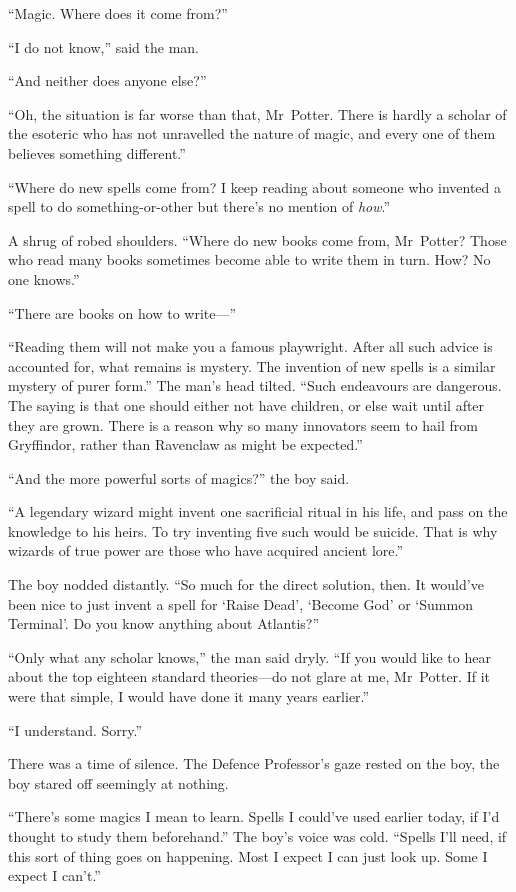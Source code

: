 “Magic. Where does it come from?”

“I do not know,” said the man.

“And neither does anyone else?”

“Oh, the situation is far worse than that, Mr~Potter. There is hardly a scholar of the esoteric who has not unravelled the nature of magic, and every one of them believes something different.”

“Where do new spells come from? I keep reading about someone who invented a spell to do something-or-other but there’s no mention of \emph{how}.”

A shrug of robed shoulders. “Where do new books come from, Mr~Potter? Those who read many books sometimes become able to write them in turn. How? No one knows.”

“There are books on how to write—”

“Reading them will not make you a famous playwright. After all such advice is accounted for, what remains is mystery. The invention of new spells is a similar mystery of purer form.” The man’s head tilted. “Such endeavours are dangerous. The saying is that one should either not have children, or else wait until after they are grown. There is a reason why so many innovators seem to hail from Gryffindor, rather than Ravenclaw as might be expected.”

“And the more powerful sorts of magics?” the boy said.

“A legendary wizard might invent one sacrificial ritual in his life, and pass on the knowledge to his heirs. To try inventing five such would be suicide. That is why wizards of true power are those who have acquired ancient lore.”

The boy nodded distantly. “So much for the direct solution, then. It would’ve been nice to just invent a spell for ‘Raise Dead’, ‘Become God’ or ‘Summon Terminal’. Do you know anything about Atlantis?”

“Only what any scholar knows,” the man said dryly. “If you would like to hear about the top eighteen standard theories—do not glare at me, Mr~Potter. If it were that simple, I would have done it many years earlier.”

“I understand. Sorry.”

There was a time of silence. The Defence Professor’s gaze rested on the boy, the boy stared off seemingly at nothing.

“There’s some magics I mean to learn. Spells I could’ve used earlier today, if I’d thought to study them beforehand.” The boy’s voice was cold. “Spells I’ll need, if this sort of thing goes on happening. Most I expect I can just look up. Some I expect I can’t.”

